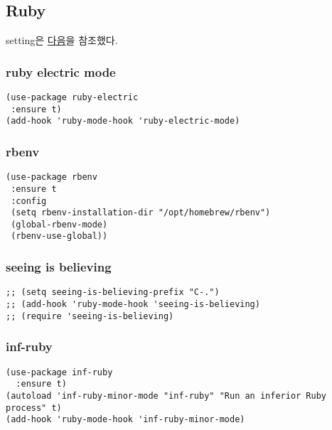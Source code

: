 \documentclass[11pt]{article}
\begin{document}
\subsection*{Ruby}
\label{sec:orgf22746c}
setting은 \href{https://worace.works/2016/06/07/getting-started-with-emacs-for-ruby/}{다음}을 참조했다.
\subsubsection*{ruby electric mode}
\label{sec:org9869e21}
\begin{verbatim}
(use-package ruby-electric
 :ensure t)
(add-hook 'ruby-mode-hook 'ruby-electric-mode)
\end{verbatim}
\subsubsection*{rbenv}
\label{sec:orge71aba1}
\begin{verbatim}
(use-package rbenv
 :ensure t
 :config
 (setq rbenv-installation-dir "/opt/homebrew/rbenv")
 (global-rbenv-mode)
 (rbenv-use-global))
\end{verbatim}
\subsubsection*{seeing is believing}
\label{sec:org901fe78}
\begin{verbatim}
;; (setq seeing-is-believing-prefix "C-.")
;; (add-hook 'ruby-mode-hook 'seeing-is-believing)
;; (require 'seeing-is-believing)
\end{verbatim}
\subsubsection*{inf-ruby}
\label{sec:org7242847}
\begin{verbatim}
(use-package inf-ruby
  :ensure t)
(autoload 'inf-ruby-minor-mode "inf-ruby" "Run an inferior Ruby process" t)
(add-hook 'ruby-mode-hook 'inf-ruby-minor-mode)

\end{verbatim}
\end{document}
